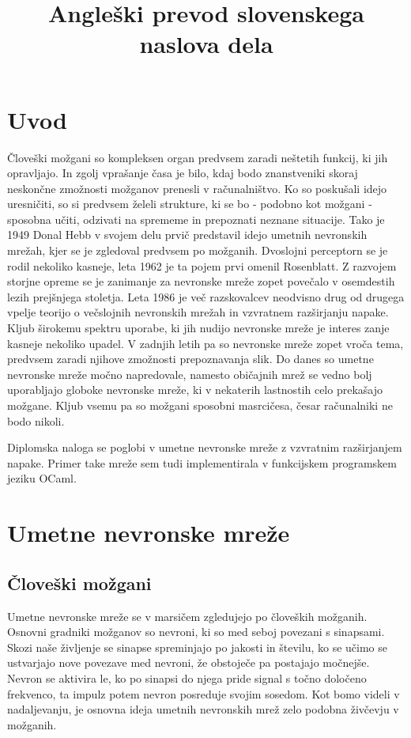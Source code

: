 \documentclass[mat1]{fmfdelo}
\title{Angleški prevod slovenskega naslova dela}
\begin{document}
\section{Uvod}

Človeški možgani so kompleksen organ predvsem zaradi neštetih funkcij, ki jih opravljajo. In zgolj vprašanje časa je bilo, kdaj bodo znanstveniki skoraj neskončne zmožnosti možganov prenesli v računalništvo. Ko so poskušali idejo uresničiti, so si predvsem želeli strukture, ki se bo - podobno kot možgani - sposobna učiti, odzivati na sprememe in prepoznati neznane situacije. Tako je 1949 Donal Hebb v svojem delu prvič predstavil idejo umetnih nevronskih mrežah, kjer se je zgledoval predvsem po možganih. Dvoslojni perceptorn se je rodil nekoliko kasneje, leta 1962 je ta pojem prvi omenil Rosenblatt. Z razvojem storjne opreme se je zanimanje za nevronske mreže zopet povečalo v osemdestih lezih prejšnjega stoletja. Leta 1986 je več razskovalcev neodvisno drug od drugega vpelje teorijo o večslojnih nevronskih mrežah in vzvratnem razširjanju napake. Kljub širokemu spektru uporabe, ki jih nudijo nevronske mreže je interes zanje kasneje nekoliko upadel. V zadnjih letih pa so nevronske mreže zopet vroča tema, predvsem zaradi njihove zmožnosti prepoznavanja slik. Do danes so umetne nevronske mreže močno napredovale, namesto običajnih mrež se vedno bolj uporabljajo globoke nevronske mreže, ki v nekaterih lastnostih celo prekašajo možgane. Kljub vsemu pa so možgani sposobni masrcičesa, česar računalniki ne bodo nikoli.

Diplomska naloga se poglobi v umetne nevronske mreže z vzvratnim razširjanjem napake. Primer take mreže sem tudi implementirala v funkcijskem programskem jeziku OCaml. 

\section{Umetne nevronske mreže}

\subsection{Človeški možgani}
Umetne nevronske mreže se v marsičem zgledujejo po človeških možganih. Osnovni gradniki možganov so nevroni, ki so med seboj povezani s sinapsami. Skozi naše življenje se sinapse spreminjajo po jakosti in številu, ko se učimo se ustvarjajo nove povezave med nevroni, že obstoječe pa postajajo močnejše. Nevron se aktivira le,  ko po sinapsi do njega pride signal s točno določeno frekvenco, ta impulz potem nevron posreduje svojim sosedom. Kot bomo videli v nadaljevanju, je osnovna ideja umetnih nevronskih mrež zelo podobna živčevju v možganih.  
\end{document}
